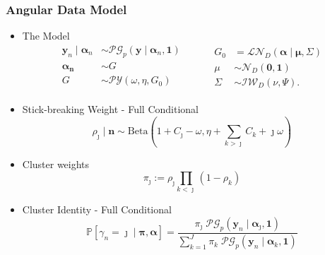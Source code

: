 \documentclass[aspectratio=169,10pt,notes]{beamer}
\begin{document}
\begin{frame}
    \frametitle{Angular Data Model}
    \label{ndpg:angulardatamodel}
    {\small 
    \begin{itemize}
    \item The Model
    \[
        \begin{aligned}
        \bm{y}_n \mid \bm{\alpha}_n &\sim \mathcal{PG}_p
                \left(\bm{y}\mid\bm{\alpha}_n, \bm{1}\right)\\
        \bm{\alpha_n} &\sim G\\
        G &\sim \mathcal{PY}\left(\omega, \eta, G_0\right)\\
        \end{aligned}
        ~\hspace{1cm}
        \begin{aligned}
        G_0 &= \mathcal{LN}_D\left(\bm{\alpha}\mid\bm{\mu},\Sigma\right)\\
        \mu &\sim \mathcal{N}_D\left(\bm{0},\bm{1}\right)\\
        \Sigma &\sim \mathcal{IW}_D\left(\nu, \Psi\right).
        \end{aligned}
    \]
    \item Stick-breaking Weight - Full Conditional
    \[
    \rho_{\jmath} \mid \bm{n} \sim \text{Beta}\left(1 + C_{\jmath} - \omega, 
            \eta + \sum_{k > \jmath} C_k + \jmath \omega\right)
    \]
    \item Cluster weights
    \[
        \pi_{\jmath} := \rho_{\jmath} \prod_{k < \jmath}(1 - \rho_k)
    \]
    \item Cluster Identity - Full Conditional
    \[
    \mathbb{P}\left[\gamma_n = \jmath \mid \bm{\pi},\bm{\alpha}\right] =
            \frac{\pi_{\jmath}\;\mathcal{PG}_p\left(\bm{y}_n\mid\bm{\alpha}_{\jmath},\bm{1}\right)}{
                \sum_{k = 1}^J \pi_k\;
                \mathcal{PG}_p\left(\bm{y}_n\mid\bm{\alpha}_k,\bm{1}\right)}
    \]
    \end{itemize}
    }
    \hyperlink{ndpg:estimationofangularscore}{}
\end{frame} %
\end{document}
